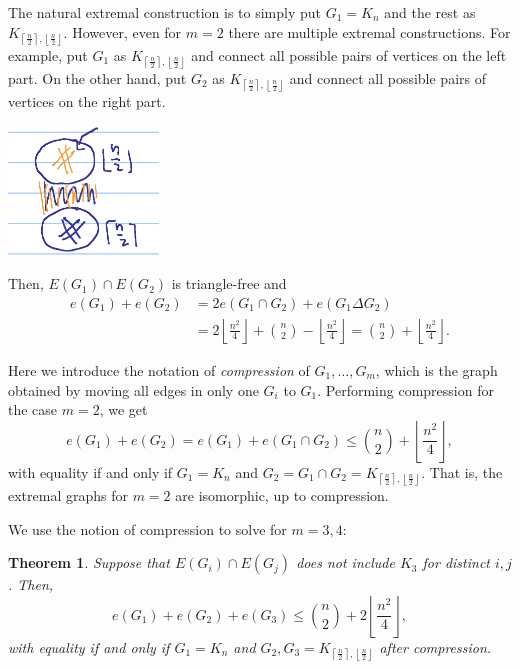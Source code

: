 \documentclass[a4paper]{article}
\newtheorem{theorem}{Theorem}[section]
\begin{document}
The natural extremal construction is to simply put $G_1 = K_n$ and the rest as
  $K_{\left\lceil\frac{n}{2}\right\rceil, \left\lfloor\frac{n}{2}\right\rfloor}$. However, even for
  $m = 2$ there are multiple extremal constructions. For example, put $G_1$ as
  $K_{\left\lceil\frac{n}{2}\right\rceil, \left\lfloor\frac{n}{2}\right\rfloor}$ and connect all
  possible pairs of vertices on the left part. On the other hand, put $G_2$ as
  $K_{\left\lceil\frac{n}{2}\right\rceil, \left\lfloor\frac{n}{2}\right\rfloor}$ and connect all
  possible pairs of vertices on the right part. 
  \begin{center}
    \includegraphics[width=0.3\textwidth]{non-induced-m2}
  \end{center}
  Then, $E(G_1) \cap E(G_2)$ is triangle-free and
  \begin{align*}
    e(G_1) + e(G_2) 
    &= 2e(G_1 \cap G_2) + e(G_1 \Delta G_2) \\
    &= 2\left\lfloor\frac{n^2}{4}\right\rfloor + \binom{n}{2} - \left\lfloor\frac{n^2}{4}\right\rfloor = \binom{n}{2} + \left\lfloor\frac{n^2}{4}\right\rfloor.
  \end{align*}

  Here we introduce the notation of \textit{compression} of $G_1, \ldots, G_m$, which is the graph
  obtained by moving all edges in only one $G_i$ to $G_1$. Performing compression for the case $m =
  2$, we get 
  \[
    e(G_1) + e(G_2) = e(G_1) + e(G_1 \cap G_2) \leq \binom{n}{2} + \left\lfloor\frac{n^2}{4}\right\rfloor,
  \]
  with equality if and only if $G_1 = K_n$ and $G_2 = G_1 \cap G_2 =
  K_{\left\lceil\frac{n}{2}\right\rceil, \left\lfloor\frac{n}{2}\right\rfloor}$. That is, the
  extremal graphs for $m = 2$ are isomorphic, up to compression.

  We use the notion of compression to solve for $m = 3, 4$:
  \begin{theorem}
    Suppose that $E(G_i) \cap E(G_j)$ does not include $K_3$ for distinct $i, j$. Then,
    \[
      e(G_1) + e(G_2) + e(G_3) \leq \binom{n}{2} + 2\left\lfloor\frac{n^2}{4}\right\rfloor,
    \]
    with equality if and only if $G_1 = K_n$ and $G_2, G_3 = K_{\left\lceil\frac{n}{2}\right\rceil,
    \left\lfloor\frac{n}{2}\right\rfloor}$ after compression.
  \end{theorem}
\end{document}
